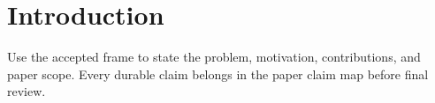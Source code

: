 \section{Introduction}

Use the accepted frame to state the problem, motivation, contributions, and
paper scope. Every durable claim belongs in the paper claim map before final
review.
